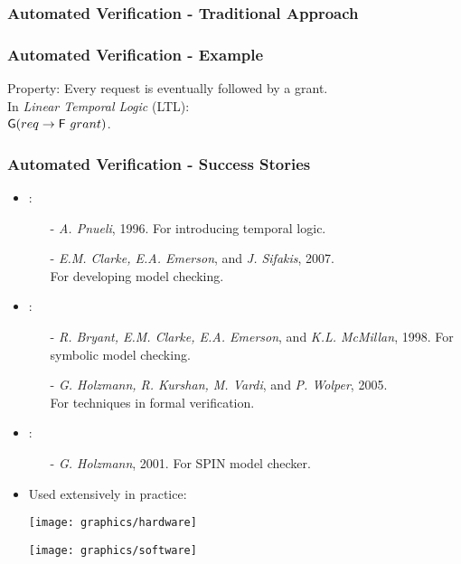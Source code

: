 
\begin{frame}
\frametitle{Automated Verification - Traditional Approach}
\end{frame}

\begin{frame}
\frametitle{Automated Verification - Example}
\onslide<+->
\onslide<+->

Property: Every request is eventually followed by a grant.\\
\onslide<+->
In {\em Linear Temporal Logic} (LTL):\\
 $\mathsf{G}({req}\to \mathsf{F}\ grant)$. 

\end{frame}


\begin{frame}
\frametitle{Automated Verification - Success Stories}
\begin{itemize}
\item {}:
\begin{itemize}
\item[-] \emph{A. Pnueli}, 1996. For introducing temporal logic.
\item[-] \emph{E.M. Clarke, E.A. Emerson}, and \emph{J. Sifakis}, 2007.\\ For developing model checking.
\end{itemize} 
\item {}:
\begin{itemize}
\item[-] \emph{R. Bryant, E.M. Clarke, E.A. Emerson}, and \emph{K.L. McMillan}, 1998. For symbolic model checking.
\item[-] \emph{G. Holzmann, R. Kurshan, M. Vardi}, and \emph{P. Wolper}, 2005.\\ For techniques in formal verification.
\end{itemize}
\item {}: 
\begin{itemize}
\item[-] \emph{G. Holzmann}, 2001. For SPIN model checker.
\end{itemize}
\item Used extensively in practice: 
\item[] \texttt{[image: graphics/hardware]}
\item[] \texttt{[image: graphics/software]}
\end{itemize}
\end{frame}


